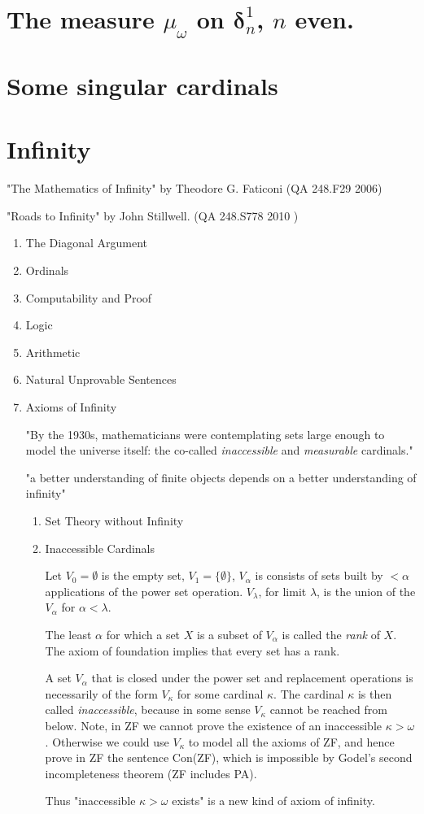 \documentclass[bibother]{asl}
\theoremstyle{definition}
\theoremstyle{remark}
\newcommand{\bd}{\boldsymbol{\delta}}
\begin{document}
\section{The measure $\mu_\omega$ on $\bd^1_n$, $n$ even.}

\section{Some singular cardinals}

\newpage


\section{Infinity}

"The Mathematics of Infinity" by Theodore G. Faticoni (QA 248.F29 2006)

"Roads to Infinity" by John Stillwell. (QA 248.S778 2010 )

\begin{enumerate}
\item The Diagonal Argument
\item Ordinals
\item Computability and Proof
\item Logic
\item Arithmetic
\item Natural Unprovable Sentences
\item Axioms of Infinity

"By the 1930s, mathematicians were contemplating sets large enough to model the universe itself: the co-called \emph{inaccessible} and \emph{measurable} cardinals."

"a better understanding of finite objects depends on a better understanding of infinity"
\begin{enumerate}
\item Set Theory without Infinity
\item Inaccessible Cardinals

Let $V_0=\emptyset$ is the empty set, $V_1=\{\emptyset \}$, $V_\alpha$ is consists of sets built by $<\alpha$ applications of the power set operation. $V_\lambda$, for limit $\lambda$, is the union of the $V_\alpha$ for $\alpha<\lambda$.

The least $\alpha$ for which a set $X$ is a subset of $V_\alpha$ is called the \emph{rank} of $X$. The axiom of foundation implies that every set has a rank.

A set $V_\alpha$ that is closed under the power set and replacement operations is necessarily of the form $V_\kappa$ for some cardinal $\kappa$. The cardinal $\kappa$ is then called \emph{inaccessible}, because in some sense $V_\kappa$ cannot be reached from below.
Note, in ZF we cannot prove the existence of an inaccessible $\kappa>\omega$. Otherwise we could use $V_\kappa$ to model all the axioms of ZF, and hence prove in ZF the sentence Con(ZF), which is impossible by Godel's second incompleteness theorem (ZF includes PA).

Thus "inaccessible $\kappa>\omega$ exists" is a new kind of axiom of infinity.
\end{enumerate}
\end{enumerate}
\end{document}
